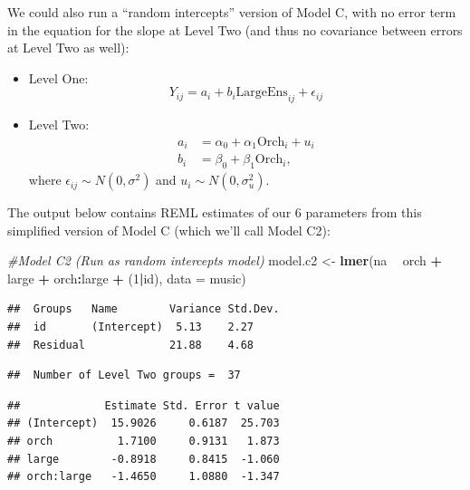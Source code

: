 \documentclass[
]{krantz}
\newenvironment{Shaded}{\begin{snugshade}}{\end{snugshade}}
\newcommand{\CommentTok}[1]{\textcolor[rgb]{0.37,0.37,0.37}{\textit{#1}}}
\newcommand{\DataTypeTok}[1]{\textcolor[rgb]{0.27,0.27,0.27}{#1}}
\newcommand{\DecValTok}[1]{\textcolor[rgb]{0.06,0.06,0.06}{#1}}
\newcommand{\KeywordTok}[1]{\textcolor[rgb]{0.27,0.27,0.27}{\textbf{#1}}}
\newcommand{\NormalTok}[1]{#1}
\newcommand{\OperatorTok}[1]{\textcolor[rgb]{0.43,0.43,0.43}{\textbf{#1}}}
\newcommand{\StringTok}[1]{\textcolor[rgb]{0.5,0.5,0.5}{#1}}
\begin{document}
We could also run a ``random intercepts'' version of Model C, with no error term in the equation for the slope at Level Two (and thus no covariance between errors at Level Two as well):

\begin{itemize}
\item
  Level One:
  \begin{equation*}
  Y_{ij} = a_{i}+b_{i}\textrm{LargeEns}_{ij}+\epsilon_{ij}
  \end{equation*}
\item
  Level Two:
  \begin{align*}
  a_{i} & = \alpha_{0}+\alpha_{1}\textrm{Orch}_{i}+u_{i} \\
  b_{i} & = \beta_{0}+\beta_{1}\textrm{Orch}_{i},
  \end{align*}
  where \(\epsilon_{ij}\sim N(0,\sigma^2)\) and \(u_{i}\sim N(0,\sigma_{u}^{2})\).
\end{itemize}

The output below contains REML estimates of our 6 parameters from this simplified version of Model C (which we'll call Model C2):

\begin{Shaded}
\begin{Highlighting}[]
\CommentTok{#Model C2 (Run as random intercepts model)}
\NormalTok{model.c2 <-}\StringTok{ }\KeywordTok{lmer}\NormalTok{(na }\OperatorTok{~}\StringTok{ }\NormalTok{orch }\OperatorTok{+}\StringTok{ }\NormalTok{large }\OperatorTok{+}\StringTok{ }\NormalTok{orch}\OperatorTok{:}\NormalTok{large }\OperatorTok{+}
\StringTok{  }\NormalTok{(}\DecValTok{1}\OperatorTok{|}\NormalTok{id), }\DataTypeTok{data =}\NormalTok{ music)}
\end{Highlighting}
\end{Shaded}

\begin{verbatim}
##  Groups   Name        Variance Std.Dev.
##  id       (Intercept)  5.13    2.27    
##  Residual             21.88    4.68
\end{verbatim}

\begin{verbatim}
##  Number of Level Two groups =  37
\end{verbatim}

\begin{verbatim}
##             Estimate Std. Error t value
## (Intercept)  15.9026     0.6187  25.703
## orch          1.7100     0.9131   1.873
## large        -0.8918     0.8415  -1.060
## orch:large   -1.4650     1.0880  -1.347
\end{verbatim}
\end{document}
